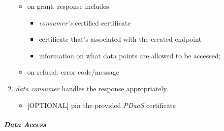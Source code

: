\documentclass[12pt,english,a4paper,titlepage,cleardoublepage=empty,dottedtoc]{report}
\providecommand{\tightlist}{%
  \setlength{\itemsep}{0pt}\setlength{\parskip}{0pt}}
\begin{document}
\begin{enumerate}
  \begin{itemize}
  \tightlist
  \item
    on grant, response includes

    \begin{itemize}
    \tightlist
    \item
      \emph{consumer's} certified certificate
    \item
      certificate that's associated with the created endpoint
    \item
      information on what data points are allowed to be accessed;
    \end{itemize}
  \item
    on refusal: error code/message
  \end{itemize}
\item
  \emph{data consumer} handles the response appropriately

  \begin{itemize}
  \tightlist
  \item
    {[}OPTIONAL{]} pin the provided \emph{PDaaS} certificate
  \end{itemize}
\end{enumerate}

\subparagraph{Data Access}\label{data-access}
\end{document}
